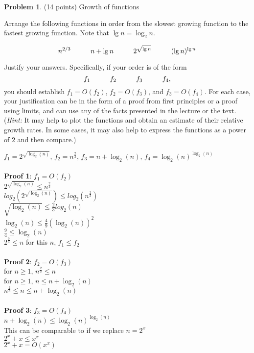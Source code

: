 \documentclass[11pt]{article}
\newcommand{\hs}{\hspace{0.2in}}
\theoremstyle{definition}
\theoremstyle{theorem}
\newtheorem{prob}{Problem}
\newcommand{\solution}[1]{\medskip\noindent{\color{DarkBlue}\textbf{Solution:}} #1}
\newcommand{\solution}[1]{}
\begin{document}
\newpage
\begin{prob}
\label{prob:function_growth}
(14 points) Growth of functions
\end{prob}

Arrange the following functions in order from the slowest growing
function to the fastest growing function. Note that $\lg n = \log_2 n$.

\[ n^{2/3} \hs \hs n + \lg n \hs \hs 2^{\sqrt{\lg n}} \hs \hs (\lg n)^{\lg n}\]

Justify your answers.  Specifically, if your order is of the form
\[
f_1 \hs \hs f_2 \hs \hs f_3 \hs \hs f_4,
\]
you should establish $f_1 = O(f_2)$, $f_2 = O(f_3)$, and $f_3 =
O(f_4)$.  For each case, your justification can be in the form of a
proof from first principles or a proof using limits, and can use any
of the facts presented in the lecture or the text.  ({\em Hint:} It
may help to plot the functions and obtain an estimate of their
relative growth rates.  In some cases, it may also help to express the
functions as a power of $2$ and then compare.)

\solution{
$f_1 = 2^{\sqrt{\log_2(n)}}$, $f_2 = n^{\frac{2}{3}}$, $f_3 = n + \log_2(n)$, $f_4 = \log_2(n)^{\log_2(n)}$ \\\\
\textbf{Proof 1}: $f_1 = O(f_2)$ \\
$2^{\sqrt{\log_2(n)}} \le n^{\frac{2}{3}}$ \\
$log_2(2^{\sqrt{\log_2(n)}}) \le log_2(n^{\frac{2}{3}})$ \\
$\sqrt{\log_2(n)} \le \frac{2}{3}log_2(n)$ \\
$\log_2(n) \le \frac{4}{9}(\log_2(n))^{2}$ \\
$\frac{9}{4} \le \log_2(n)$ \\
$2^{\frac{9}{4}} \le n$ for this $n$, $f_1 \le f_2$\\\\
\textbf{Proof 2}: $f_2 = O(f_3)$ \\
for $n \ge 1$, $n^{\frac{2}{3}} \le n$ \\
for $n \ge 1$, $n \le n + \log_2(n)$ \\
$n^{\frac{2}{3}} \le n \le n + \log_2(n)$ \\\\
\textbf{Proof 3}: $f_3 = O(f_4)$ \\
$n + \log_2(n) \le \log_2(n)^{\log_2(n)}$ \\
This can be comparable to if we replace $n = 2^{x}$ \\
$2^{x} + x \le x^{x}$ \\
$2^{x} + x = O(x^{x})$
}
\end{document}
